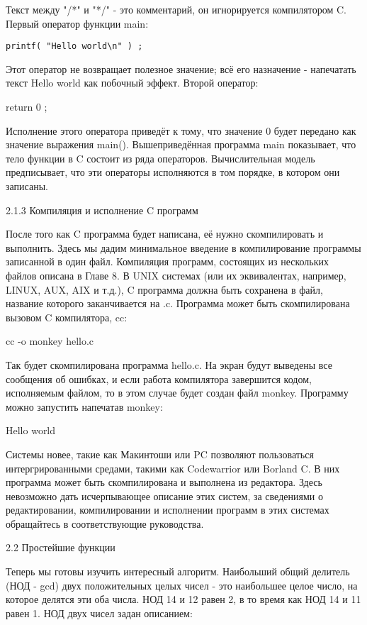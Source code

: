 Текст между "/*" и "*/" - это комментарий, он игнорируется компилятором C. Первый оператор функции main:

\begin{lstlisting}
printf( "Hello world\n" ) ;
\end{lstlisting}

Этот оператор не возвращает полезное значение; всё его назначение - напечатать текст Hello world как побочный эффект. Второй оператор:

return 0 ;

Исполнение этого оператора приведёт к тому, что значение 0 будет передано как значение выражения main(). Вышеприведённая программа main показывает, что тело функции в C состоит из ряда операторов. Вычислительная модель предписывает, что эти операторы исполняются в том порядке, в котором они записаны.

2.1.3 Компиляция и исполнение C программ

После того как C программа будет написана, её нужно скомпилировать и выполнить. Здесь мы дадим минимальное введение в компилирование программы записанной в один файл. Компиляция программ, состоящих из нескольких файлов описана в Главе 8. В UNIX системах (или их эквивалентах, например, LINUX, AUX, AIX и т.д.), C программа должна быть сохранена в файл, название которого заканчивается на .c. Программа может быть скомпилирована вызовом C компилятора, cc:

cc -o monkey hello.c

Так будет скомпилирована программа hello.c. На экран будут выведены все сообщения об ошибках, и если работа компилятора завершится кодом, исполняемым файлом, то в этом случае будет создан файл monkey. Программу можно запустить напечатав monkey:

Hello world

Системы новее, такие как Макинтоши или PC позволяют пользоваться интергрированными средами, такими как Codewarrior или Borland C. В них программа может быть скомпилирована и выполнена из редактора. Здесь невозможно дать исчерпывающее описание этих систем, за сведениями о редактировании, компилировании и исполнении программ в этих системах обращайтесь в соответствующие руководства.

2.2 Простейшие функции

Теперь мы готовы изучить интересный алгоритм. Наибольший общий делитель (НОД - gcd) двух положительных целых чисел - это наибольшее целое число, на которое делятся эти оба числа. НОД 14 и 12 равен 2, в то время как НОД 14 и 11 равен 1. НОД двух чисел задан описанием:

